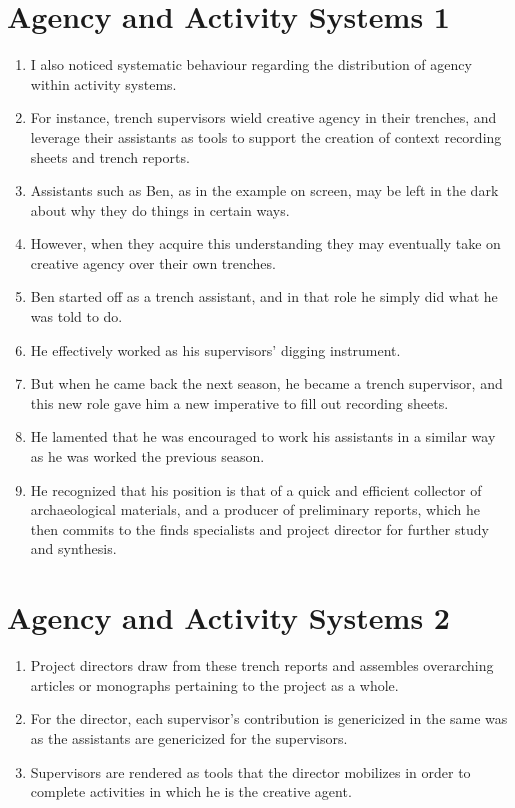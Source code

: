 \documentclass[12pt]{article}
\begin{document}
\section{Agency and Activity Systems 1}
\begin{enumerate}
  \item I also noticed systematic behaviour regarding the distribution of agency within activity systems.
  \item For instance, trench supervisors wield creative agency in their trenches, and leverage their assistants as tools to support the creation of context recording sheets and trench reports.
  \item Assistants such as Ben, as in the example on screen, may be left in the dark about why they do things in certain ways.
  \item However, when they acquire this understanding they may eventually take on creative agency over their own trenches.
  \item Ben started off as a trench assistant, and in that role he simply did what he was told to do.
  \item He effectively worked as his supervisors' digging instrument.
  \item But when he came back the next season, he became a trench supervisor, and this new role gave him a new imperative to fill out recording sheets.
  \item He lamented that he was encouraged to work his assistants in a similar way as he was worked the previous season.
  \item He recognized that his position is that of a quick and efficient collector of archaeological materials, and a producer of preliminary reports, which he then commits to the finds specialists and project director for further study and synthesis.
\end{enumerate}

\section{Agency and Activity Systems 2}
\begin{enumerate}
  \item Project directors draw from these trench reports and assembles overarching articles or monographs pertaining to the project as a whole.
  \item For the director, each supervisor's contribution is genericized in the same was as the assistants are genericized for the supervisors.
  \item Supervisors are rendered as tools that the director mobilizes in order to complete activities in which he is the creative agent.
\end{enumerate}
\end{document}
